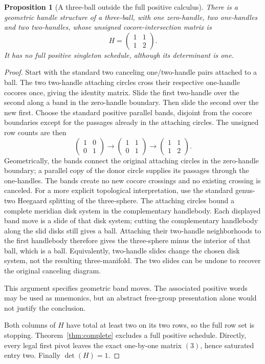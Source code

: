 \documentclass[11pt]{article}
\newtheorem{proposition}[theorem]{Proposition}
\theoremstyle{definition}\newtheorem{definition}[theorem]{Definition}
\theoremstyle{remark}\newtheorem{remark}[theorem]{Remark}
\begin{document}
\begin{proposition}[A three-ball outside the full positive calculus]
\label{prop:ballblock}
There is a geometric handle structure of a three-ball, with one zero-handle, two one-handles and two two-handles, whose unsigned cocore-intersection matrix is
\begin{equation}
 H=\begin{pmatrix}1&1\\1&2\end{pmatrix}.
 \label{eq:ballblock}
\end{equation}
It has no full positive singleton schedule, although its determinant is one.
\end{proposition}
\begin{proof}
Start with the standard two canceling one/two-handle pairs attached to a ball. The two two-handle attaching circles cross their respective one-handle cocores once, giving the identity matrix. Slide the first two-handle over the second along a band in the zero-handle boundary. Then slide the second over the new first. Choose the standard positive parallel bands, disjoint from the cocore boundaries except for the passages already in the attaching circles. The unsigned row counts are then
\[
 \begin{pmatrix}1&0\\0&1\end{pmatrix}
 \longrightarrow
 \begin{pmatrix}1&1\\0&1\end{pmatrix}
 \longrightarrow
 \begin{pmatrix}1&1\\1&2\end{pmatrix}.
\]
Geometrically, the bands connect the original attaching circles in the zero-handle boundary; a parallel copy of the donor circle supplies its passages through the one-handles. The bands create no new cocore crossings and no existing crossing is canceled. For a more explicit topological interpretation, use the standard genus-two Heegaard splitting of the three-sphere. The attaching circles bound a complete meridian disk system in the complementary handlebody. Each displayed band move is a slide of that disk system; cutting the complementary handlebody along the slid disks still gives a ball. Attaching their two-handle neighborhoods to the first handlebody therefore gives the three-sphere minus the interior of that ball, which is a ball. Equivalently, two-handle slides change the chosen disk system, not the resulting three-manifold. The two slides can be undone to recover the original canceling diagram.

This argument specifies geometric band moves. The associated positive words may be used as mnemonics, but an abstract free-group presentation alone would not justify the conclusion.

Both columns of $H$ have total at least two on its two rows, so the full row set is stopping. Theorem~\ref{thm:complete} excludes a full positive schedule. Directly, every legal first pivot leaves the exact one-by-one matrix $(3)$, hence saturated entry two. Finally $\det(H)=1$.
\end{proof}
\end{document}
